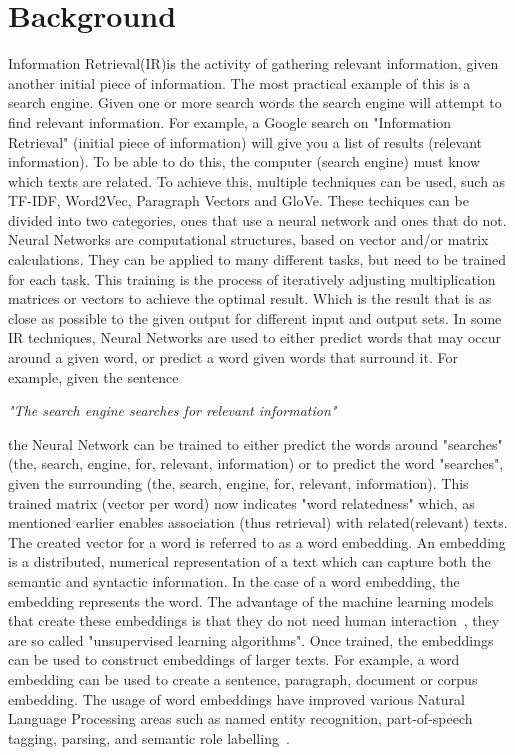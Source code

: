 \documentclass[../../Thesis.tex]{subfiles}
\begin{document}
\section{Background}
Information Retrieval(IR)is the activity of gathering relevant information, given another initial piece of information. The most practical example of this is a search engine. Given one or more search words the search engine will attempt to find relevant information. For example, a Google search on "Information Retrieval" (initial piece of information) will give you a list of results (relevant information). To be able to do this, the computer (search engine) must know which texts are related. To achieve this, multiple techniques can be used, such as TF-IDF, Word2Vec, Paragraph Vectors and GloVe. These techiques can be divided into two categories, ones that use a neural network and ones that do not.
Neural Networks are computational structures, based on vector and/or matrix calculations. They can be applied to many different tasks, but need to be trained for each task. This training is the process of iteratively adjusting multiplication matrices or vectors to achieve the optimal result. Which is the result that is as close as possible to the given output for different input and output sets.
In some IR techniques, Neural Networks are used to either predict words that may occur around a given word, or predict a word given words that surround it. For example, given the sentence\\
\begin{center}
\textit{"The search engine searches for relevant information"}
\end{center}
the Neural Network can be trained to either predict the words around "searches" (the, search, engine, for, relevant, information) or to predict the word "searches", given the surrounding (the, search, engine, for, relevant, information). This trained matrix (vector per word) now indicates "word relatedness" which, as mentioned earlier enables association (thus retrieval) with related(relevant) texts.
The created vector for a word is referred to as a word embedding. An embedding is a distributed, numerical representation of a text which can capture both the semantic and syntactic information\cite{mikolov2013distributed}. In the case of a word embedding, the embedding represents the word. The advantage of the machine learning models that create these embeddings is that they do not need human interaction~\citet{lai2016generate}, they are so called "unsupervised learning algorithms". Once trained, the embeddings can be used to construct embeddings of larger texts. For example, a word embedding can be used to create a sentence, paragraph, document or corpus embedding. The usage of word embeddings have improved various Natural Language Processing areas such as named entity recognition, part-of-speech tagging, parsing, and semantic role labelling~\citet{luong2013better}.
\end{document}
